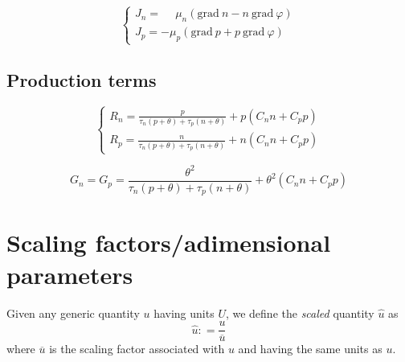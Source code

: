\documentclass[10pt]{article}
\begin{document}
\begin{equation}\label{eq:currentsN}
\left\{
\begin{array}{ll}
J_{n} = \phantom{-}\mu_{n} \left( \mathrm{grad}\ n - n\ \mathrm{grad}\ \varphi\right) 
\\[5mm]
J_{p} = -\mu_{p} \left( \mathrm{grad}\ p + p\ \mathrm{grad}\ \varphi\right)  
\end{array}
\right.
\end{equation}

\subsection{Production terms}

\begin{equation}\label{eq:recombinationN}
\left\{
\begin{array}{ll}
R_{n} = \displaystyle \frac{p}{\tau_{n} (p + \theta) + \tau_{p} (n + \theta)}
+ p \left(C_{n} n + C_{p} p \right)
\\[5mm]
R_{p} = \displaystyle \frac{n}{\tau_{n} (p + \theta) + \tau_{p} (n + \theta)}
+ n \left (C_{n} n + C_{p} p \right)
\end{array}
\right.
\end{equation}

\begin{equation}\label{eq:generationN}
G_{n} = G_{p} = 
\displaystyle \frac{\theta^{2}}{\tau_{n} (p + \theta) + \tau_{p} (n + \theta)}
+ \theta^{2} \left(C_{n} n + C_{p} p \right)
\end{equation}

\newpage

\section{Scaling factors/adimensional parameters}

Given any generic quantity $u$ having units $U$, we
define the {\em scaled} quantity $\widehat{u}$ as
$$
\widehat{u} : = \displaystyle \frac{u}{\overline{u}}
$$
where $\overline{u}$ is the scaling factor associated with $u$
and having the same units as $u$. 
\end{document}
